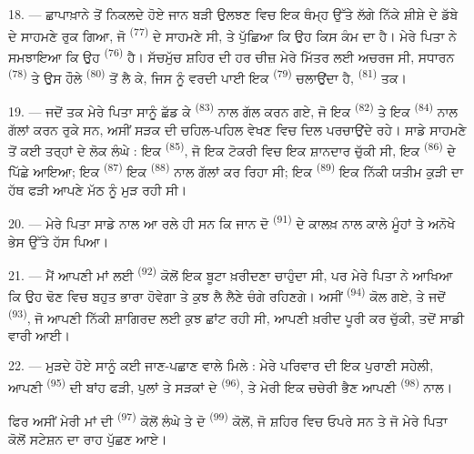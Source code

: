 \VUsaut{3.0mm}

18. --- ਛਾਪਾਖ਼ਾਨੇ ਤੋਂ ਨਿਕਲਦੇ ਹੋਏ ਜਾਨ ਬੜੀ ਉਲਝਣ ਵਿਚ ਇਕ ਥੰਮ੍ਹ ਉੱਤੇ ਲੱਗੇ ਨਿੱਕੇ ਸ਼ੀਸ਼ੇ
ਦੇ ਡੱਬੇ ਦੇ ਸਾਹਮਣੇ ਰੁਕ ਗਿਆ, ਜੋ  \textsuperscript{(77)} ਦੇ
ਸਾਹਮਣੇ ਸੀ, ਤੇ ਪੁੱਛਿਆ ਕਿ ਉਹ ਕਿਸ ਕੰਮ ਦਾ ਹੈ। ਮੇਰੇ ਪਿਤਾ ਨੇ ਸਮਝਾਇਆ ਕਿ ਉਹ
 \textsuperscript{(76)} ਹੈ। ਸੱਚਮੁੱਚ ਸ਼ਹਿਰ ਦੀ ਹਰ ਚੀਜ਼ ਮੇਰੇ ਮਿੱਤਰ
ਲਈ ਅਚਰਜ ਸੀ, ਸਧਾਰਨ  \textsuperscript{(78)} ਤੇ ਉਸ ਹੌਲੇ
 \textsuperscript{(80)} ਤੋਂ ਲੈ ਕੇ, ਜਿਸ ਨੂੰ ਵਰਦੀ ਪਾਈ ਇਕ
 \textsuperscript{(79)} ਚਲਾਉਂਦਾ ਹੈ, 
\textsuperscript{(81)} ਤਕ।

19. --- ਜਦੋਂ ਤਕ ਮੇਰੇ ਪਿਤਾ ਸਾਨੂੰ ਛੱਡ ਕੇ 
\textsuperscript{(83)} ਨਾਲ ਗੱਲ ਕਰਨ ਗਏ, ਜੋ ਇਕ  \textsuperscript{(82)}
ਤੇ ਇਕ  \textsuperscript{(84)} ਨਾਲ ਗੱਲਾਂ ਕਰਨ ਰੁਕੇ ਸਨ, ਅਸੀਂ ਸੜਕ ਦੀ
ਚਹਿਲ-ਪਹਿਲ ਵੇਖਣ ਵਿਚ ਦਿਲ ਪਰਚਾਉਂਦੇ ਰਹੇ। ਸਾਡੇ ਸਾਹਮਣੇ ਤੋਂ ਕਈ ਤਰ੍ਹਾਂ ਦੇ ਲੋਕ ਲੰਘੇ : ਇਕ
 \textsuperscript{(85)}, ਜੋ ਇਕ ਟੋਕਰੀ ਵਿਚ ਇਕ ਸ਼ਾਨਦਾਰ
 ਚੁੱਕੀ ਸੀ, ਇਕ  \textsuperscript{(86)} ਦੇ
ਪਿੱਛੇ ਆਇਆ; ਇਕ  \textsuperscript{(87)} ਇਕ
 \textsuperscript{(88)} ਨਾਲ ਗੱਲਾਂ ਕਰ ਰਿਹਾ ਸੀ; ਇਕ
 \textsuperscript{(89)} ਇਕ ਨਿੱਕੀ ਯਤੀਮ ਕੁੜੀ ਦਾ ਹੱਥ ਫੜੀ ਆਪਣੇ ਮੱਠ ਨੂੰ ਮੁੜ
ਰਹੀ ਸੀ।

\VUsaut{3.0mm}

20. --- ਮੇਰੇ ਪਿਤਾ ਸਾਡੇ ਨਾਲ ਆ ਰਲੇ ਹੀ ਸਨ ਕਿ ਜਾਨ ਦੋ 
\textsuperscript{(91)} ਦੇ ਕਾਲਖ਼ ਨਾਲ ਕਾਲੇ ਮੂੰਹਾਂ ਤੇ ਅਨੋਖੇ ਭੇਸ ਉੱਤੇ ਹੱਸ ਪਿਆ।

21. --- ਮੈਂ ਆਪਣੀ ਮਾਂ ਲਈ  \textsuperscript{(92)} ਕੋਲੋਂ ਇਕ
ਬੂਟਾ ਖ਼ਰੀਦਣਾ ਚਾਹੁੰਦਾ ਸੀ, ਪਰ ਮੇਰੇ ਪਿਤਾ ਨੇ ਆਖਿਆ ਕਿ ਉਹ ਢੋਣ ਵਿਚ ਬਹੁਤ ਭਾਰਾ ਹੋਵੇਗਾ ਤੇ
ਕੁਝ  ਲੈ ਲੈਣੇ ਚੰਗੇ ਰਹਿਣਗੇ। ਅਸੀਂ 
\textsuperscript{(94)} ਕੋਲ ਗਏ, ਤੇ ਜਦੋਂ  \textsuperscript{(93)}, ਜੋ
ਆਪਣੀ ਨਿੱਕੀ ਸ਼ਾਗਿਰਦ ਲਈ ਕੁਝ ਛਾਂਟ ਰਹੀ ਸੀ, ਆਪਣੀ ਖ਼ਰੀਦ ਪੂਰੀ ਕਰ ਚੁੱਕੀ, ਤਦੋਂ ਸਾਡੀ ਵਾਰੀ
ਆਈ।

22. --- ਮੁੜਦੇ ਹੋਏ ਸਾਨੂੰ ਕਈ ਜਾਣ-ਪਛਾਣ ਵਾਲੇ ਮਿਲੇ : ਮੇਰੇ ਪਰਿਵਾਰ ਦੀ ਇਕ ਪੁਰਾਣੀ ਸਹੇਲੀ,
ਆਪਣੀ  \textsuperscript{(95)} ਦੀ ਬਾਂਹ ਫੜੀ, ਪੁਲਾਂ ਤੇ ਸੜਕਾਂ ਦੇ
 \textsuperscript{(96)}, ਤੇ ਮੇਰੀ ਇਕ ਚਚੇਰੀ ਭੈਣ ਆਪਣੀ 
\textsuperscript{(98)} ਨਾਲ।

ਫਿਰ ਅਸੀਂ ਮੇਰੀ ਮਾਂ ਦੀ  \textsuperscript{(97)} ਕੋਲੋਂ ਲੰਘੇ
ਤੇ ਦੋ  \textsuperscript{(99)} ਕੋਲੋਂ, ਜੋ ਸ਼ਹਿਰ ਵਿਚ ਓਪਰੇ ਸਨ ਤੇ ਜੋ ਮੇਰੇ
ਪਿਤਾ ਕੋਲੋਂ ਸਟੇਸ਼ਨ ਦਾ ਰਾਹ ਪੁੱਛਣ ਆਏ।
\VUsaut{6.0mm}
\VUfilet{22mm}
